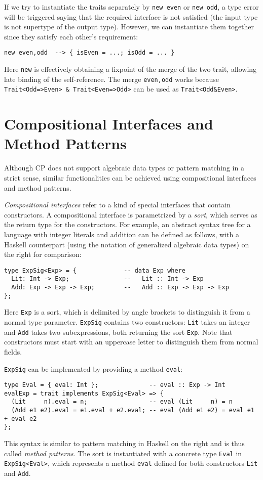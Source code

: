 \noindent
If we try to instantiate the traits separately by \lstinline{new even} or
\lstinline{new odd}, a type error will be triggered saying that the required
interface is not satisfied (the input type is not supertype of the output type).
However, we can instantiate them together since they satisfy each other's
requirement:
\begin{lstlisting}
new even,odd  --> { isEven = ...; isOdd = ... }
\end{lstlisting}
Here \lstinline{new} is effectively obtaining a fixpoint of the merge of the two
trait, allowing late binding of the self-reference. The merge
\lstinline{even,odd} works because \lstinline{Trait<Odd=>Even> & Trait<Even=>Odd>}
can be used as \lstinline{Trait<Odd&Even>}.

\section{Compositional Interfaces and Method Patterns}

Although CP does not support algebraic data types or pattern matching in a
strict sense, similar functionalities can be achieved using compositional
interfaces and method patterns.

\emph{Compositional interfaces} refer to a kind of special interfaces that
contain constructors. A compositional interface is parametrized by a
\emph{sort}, which serves as the return type for the constructors. For example,
an abstract syntax tree for a language with integer literals and addition can be
defined as follows, with a Haskell counterpart (using the notation of
generalized algebraic data types) on the right for comparison:
\begin{lstlisting}
type ExpSig<Exp> = {             -- data Exp where
  Lit: Int -> Exp;               --   Lit :: Int -> Exp
  Add: Exp -> Exp -> Exp;        --   Add :: Exp -> Exp -> Exp
};
\end{lstlisting}
Here \lstinline{Exp} is a sort, which is delimited by angle brackets to
distinguish it from a normal type parameter. \lstinline{ExpSig} contains two
constructors: \lstinline{Lit} takes an integer and \lstinline{Add} takes two
subexpressions, both returning the sort \lstinline{Exp}. Note that constructors
must start with an uppercase letter to distinguish them from normal fields.

\lstinline{ExpSig} can be implemented by providing a method \lstinline{eval}:
\begin{lstlisting}
type Eval = { eval: Int };              -- eval :: Exp -> Int
evalExp = trait implements ExpSig<Eval> => {
  (Lit     n).eval = n;                 -- eval (Lit     n) = n
  (Add e1 e2).eval = e1.eval + e2.eval; -- eval (Add e1 e2) = eval e1 + eval e2
};
\end{lstlisting}
This syntax is similar to pattern matching in Haskell on the right and is thus
called \emph{method patterns}. The sort is instantiated with a concrete type
\lstinline{Eval} in \lstinline{ExpSig<Eval>}, which represents a method
\lstinline{eval} defined for both constructors \lstinline{Lit} and
\lstinline{Add}.

